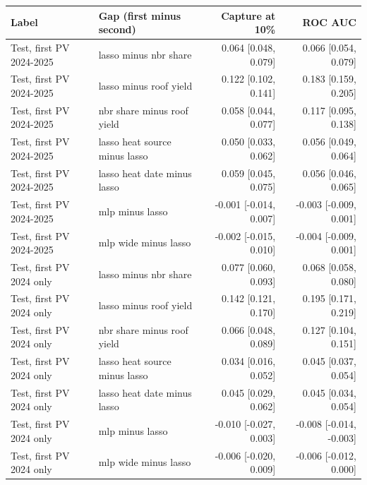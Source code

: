 \begin{tabular}{llrr}
\toprule
Label & Gap (first minus second) & Capture at 10\% & ROC AUC \\
\midrule
Test, first PV 2024-2025 & lasso minus nbr share & 0.064 [0.048, 0.079] & 0.066 [0.054, 0.079] \\
Test, first PV 2024-2025 & lasso minus roof yield & 0.122 [0.102, 0.141] & 0.183 [0.159, 0.205] \\
Test, first PV 2024-2025 & nbr share minus roof yield & 0.058 [0.044, 0.077] & 0.117 [0.095, 0.138] \\
Test, first PV 2024-2025 & lasso heat source minus lasso & 0.050 [0.033, 0.062] & 0.056 [0.049, 0.064] \\
Test, first PV 2024-2025 & lasso heat date minus lasso & 0.059 [0.045, 0.075] & 0.056 [0.046, 0.065] \\
Test, first PV 2024-2025 & mlp minus lasso & -0.001 [-0.014, 0.007] & -0.003 [-0.009, 0.001] \\
Test, first PV 2024-2025 & mlp wide minus lasso & -0.002 [-0.015, 0.010] & -0.004 [-0.009, 0.001] \\
\midrule
Test, first PV 2024 only & lasso minus nbr share & 0.077 [0.060, 0.093] & 0.068 [0.058, 0.080] \\
Test, first PV 2024 only & lasso minus roof yield & 0.142 [0.121, 0.170] & 0.195 [0.171, 0.219] \\
Test, first PV 2024 only & nbr share minus roof yield & 0.066 [0.048, 0.089] & 0.127 [0.104, 0.151] \\
Test, first PV 2024 only & lasso heat source minus lasso & 0.034 [0.016, 0.052] & 0.045 [0.037, 0.054] \\
Test, first PV 2024 only & lasso heat date minus lasso & 0.045 [0.029, 0.062] & 0.045 [0.034, 0.054] \\
Test, first PV 2024 only & mlp minus lasso & -0.010 [-0.027, 0.003] & -0.008 [-0.014, -0.003] \\
Test, first PV 2024 only & mlp wide minus lasso & -0.006 [-0.020, 0.009] & -0.006 [-0.012, 0.000] \\
\bottomrule
\end{tabular}
